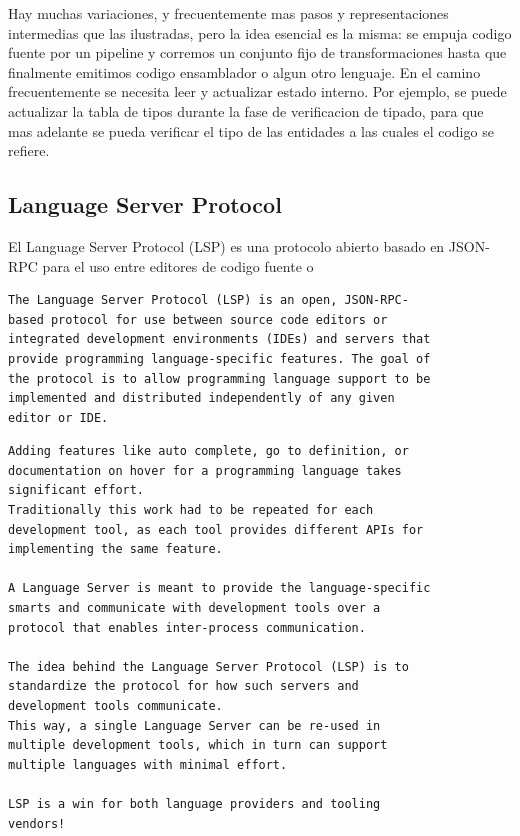 \documentclass[12pt, a4paper]{report}
\begin{document}
Hay muchas variaciones, y frecuentemente mas pasos y representaciones
intermedias que las ilustradas, pero la idea esencial es la misma: se empuja
codigo fuente por un pipeline y corremos un conjunto fijo de transformaciones
hasta que finalmente emitimos codigo ensamblador o algun otro lenguaje. En el
camino frecuentemente se necesita leer y actualizar estado interno. Por ejemplo,
se puede actualizar la tabla de tipos durante la fase de verificacion de tipado,
para que mas adelante se pueda verificar el tipo de las entidades a las cuales
el codigo se refiere. \cite{olle_query_based}

\subsection*{Language Server Protocol}

El Language Server Protocol (LSP) es una protocolo abierto basado en JSON-RPC
para el uso entre editores de codigo fuente o

\begin{verbatim}
The Language Server Protocol (LSP) is an open, JSON-RPC-
based protocol for use between source code editors or
integrated development environments (IDEs) and servers that
provide programming language-specific features. The goal of
the protocol is to allow programming language support to be
implemented and distributed independently of any given
editor or IDE.
\end{verbatim}
\cite{language_server_protocol}

\begin{verbatim}
Adding features like auto complete, go to definition, or
documentation on hover for a programming language takes
significant effort.
Traditionally this work had to be repeated for each
development tool, as each tool provides different APIs for
implementing the same feature.

A Language Server is meant to provide the language-specific
smarts and communicate with development tools over a
protocol that enables inter-process communication.

The idea behind the Language Server Protocol (LSP) is to
standardize the protocol for how such servers and
development tools communicate.
This way, a single Language Server can be re-used in
multiple development tools, which in turn can support
multiple languages with minimal effort.

LSP is a win for both language providers and tooling
vendors!
\end{verbatim}
\cite{language_server_protocol}
\end{document}
